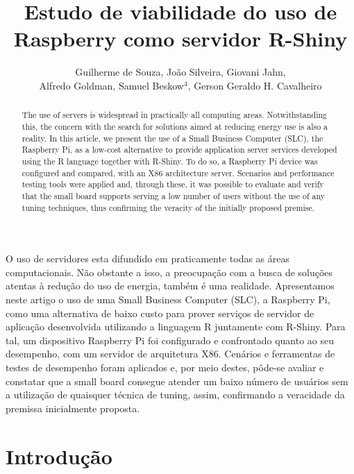 \documentclass[12pt,english,brazil]{article}
\title{Estudo de viabilidade do uso de Raspberry como servidor R-Shiny}
\author{Guilherme de Souza\inst{1}, João Silveira\inst{1}, Giovani Jahn\inst{1}, \\Alfredo Goldman\inst{3}, Samuel Beskow$^4$, Gerson Geraldo H. Cavalheiro\inst{1}}
\begin{document}
 

\maketitle
    
\en
\begin{abstract}
The use of servers is widespread in practically all computing areas. Notwithstanding this, the concern with the search for solutions aimed at reducing energy use is also a reality. In this article, we present the use of a Small Business Computer (SLC), the Raspberry Pi, as a low-cost alternative to provide application server services developed using the R language together with R-Shiny. To do so, a Raspberry Pi device was configured and compared, with an X86 architecture server. Scenarios and performance testing tools were applied and, through these, it was possible to evaluate and verify that the small board supports serving a low number of users without the use of any tuning techniques, thus confirming the veracity of the initially proposed premise.

\end{abstract}

\begin{resumo}
O uso de servidores esta difundido em praticamente todas as áreas computacionais. Não obstante a isso, a preocupação com a busca de soluções atentas à redução do uso de energia, também é uma realidade.  Apresentamos neste artigo o uso de uma Small Business Computer (SLC), a Raspberry Pi, como uma alternativa de baixo custo para prover serviços de servidor de aplicação desenvolvida utilizando a linguagem R juntamente com R-Shiny. Para tal, um dispositivo Raspberry Pi foi configurado e confrontado quanto ao seu desempenho, com um servidor de arquitetura X86. Cenários e ferramentas de testes de desempenho foram aplicados e, por meio destes, pôde-se avaliar e constatar que a small board consegue atender um baixo número de usuários sem a utilização de quaisquer técnica de tuning, assim, confirmando a veracidade da premissa inicialmente proposta.


\end{resumo}



\section{Introdução}
\end{document}
